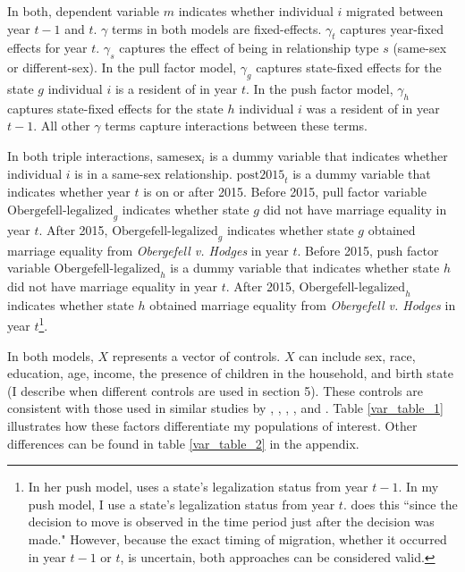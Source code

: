 \documentclass[12pt,letterpaper]{article}
\begin{document}
In both, dependent variable $m$ indicates whether individual $i$ migrated between year $t-1$ and $t$. $\gamma$ terms in both models are fixed-effects. $\gamma_t$ captures year-fixed effects for year $t$. $\gamma_s$ captures the effect of being in relationship type $s$ (same-sex or different-sex). In the pull factor model, $\gamma_g$ captures state-fixed effects for the state $g$ individual $i$ is a resident of in year $t$. In the push factor model, $\gamma_h$ captures state-fixed effects for the state $h$ individual $i$ was a resident of in year $t-1$. All other $\gamma$ terms capture interactions between these terms. 

In both triple interactions, $\text{samesex}_i$ is a dummy variable that indicates whether individual $i$ is in a same-sex relationship. $\text{post2015}_t$ is a dummy variable that indicates whether year $t$ is on or after 2015. Before 2015, pull factor variable $\text{Obergefell-legalized}_g$ indicates whether state $g$ did not have marriage equality in year $t$. After 2015, $\text{Obergefell-legalized}_g$ indicates whether state $g$ obtained marriage equality from \textit{Obergefell v. Hodges} in year $t$. Before 2015, push factor variable $\text{Obergefell-legalized}_h$ is a dummy variable that indicates whether state $h$ did not have marriage equality in year $t$. After 2015, $\text{Obergefell-legalized}_h$ indicates whether state $h$ obtained marriage equality from \textit{Obergefell v. Hodges} in year $t$\footnote{In her push model, \citet{12} uses a state's legalization status from year $t-1$. In my push model, I use a state's legalization status from year $t$. \citet{12} does this ``since the decision to move is observed in the time
period just after the decision was made." However, because the exact timing of migration, whether it occurred in year $t-1$ or $t$, is uncertain, both approaches can be considered valid.}.

In both models, $X$ represents a vector of controls. $X$ can include sex, race, education, age, income, the presence of children in the household, and birth state (I describe when different controls are used in section 5). These controls are consistent with those used in similar studies by \citet{1}, \citet{3}, \citet{5}, \citet{7}, and \citet{12}. Table \ref{var_table_1} illustrates how these factors differentiate my populations of interest. Other differences can be found in table \ref{var_table_2} in the appendix.


\end{document}
